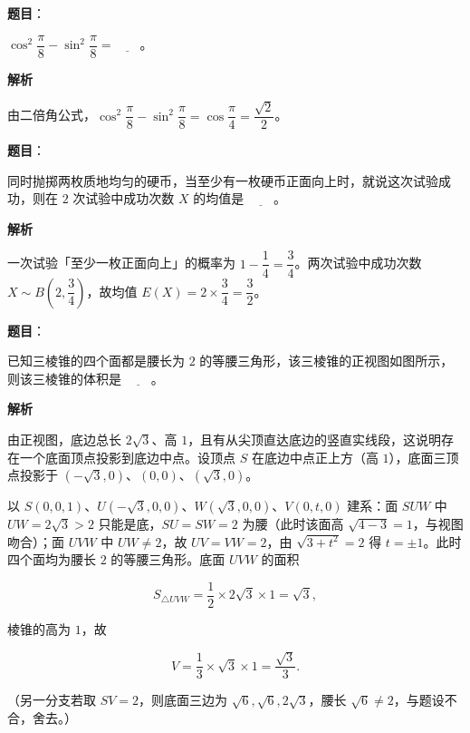 \begin{answer}

\textbf{题目}：

\(\cos^{2}\dfrac{\pi}{8}-\sin^{2}\dfrac{\pi}{8}=\underline{\qquad}\)。

\textbf{解析}

由二倍角公式，\(\cos^{2}\dfrac{\pi}{8}-\sin^{2}\dfrac{\pi}{8}=\cos\dfrac{\pi}{4}=\dfrac{\sqrt{2}}{2}\)。


\end{answer}
\begin{answer}

\textbf{题目}：

同时抛掷两枚质地均匀的硬币，当至少有一枚硬币正面向上时，就说这次试验成功，则在 \(2\) 次试验中成功次数 \(X\) 的均值是 \(\underline{\qquad}\)。

\textbf{解析}

一次试验「至少一枚正面向上」的概率为 \(1-\dfrac{1}{4}=\dfrac{3}{4}\)。两次试验中成功次数 \(X\sim B\left(2,\dfrac{3}{4}\right)\)，故均值 \(E(X)=2\times\dfrac{3}{4}=\dfrac{3}{2}\)。


\end{answer}
\begin{answer}

\textbf{题目}：

已知三棱锥的四个面都是腰长为 \(2\) 的等腰三角形，该三棱锥的正视图如图所示，则该三棱锥的体积是 \(\underline{\qquad}\)。
\nopagebreak[4]
\begin{center}\end{center}
\nopagebreak[4]
\textbf{解析}

由正视图，底边总长 \(2\sqrt{3}\)、高 \(1\)，且有从尖顶直达底边的竖直实线段，这说明存在一个底面顶点投影到底边中点。设顶点 \(S\) 在底边中点正上方（高 \(1\)），底面三顶点投影于 \((-\sqrt{3},0)\)、\((0,0)\)、\((\sqrt{3},0)\)。

以 \(S(0,0,1)\)、\(U(-\sqrt{3},0,0)\)、\(W(\sqrt{3},0,0)\)、\(V(0,t,0)\) 建系：面 \(SUW\) 中 \(UW=2\sqrt{3}>2\) 只能是底，\(SU=SW=2\) 为腰（此时该面高 \(\sqrt{4-3}=1\)，与视图吻合）；面 \(UVW\) 中 \(UW\neq2\)，故 \(UV=VW=2\)，由 \(\sqrt{3+t^{2}}=2\) 得 \(t=\pm1\)。此时四个面均为腰长 \(2\) 的等腰三角形。底面 \(UVW\) 的面积

\nopagebreak[4]
\[
S_{\triangle UVW}=\frac{1}{2}\times2\sqrt{3}\times1=\sqrt{3},
\]

棱锥的高为 \(1\)，故

\nopagebreak[4]
\[
V=\frac{1}{3}\times\sqrt{3}\times1=\frac{\sqrt{3}}{3}.
\]

（另一分支若取 \(SV=2\)，则底面三边为 \(\sqrt{6},\sqrt{6},2\sqrt{3}\)，腰长 \(\sqrt{6}\neq2\)，与题设不合，舍去。）


\end{answer}
